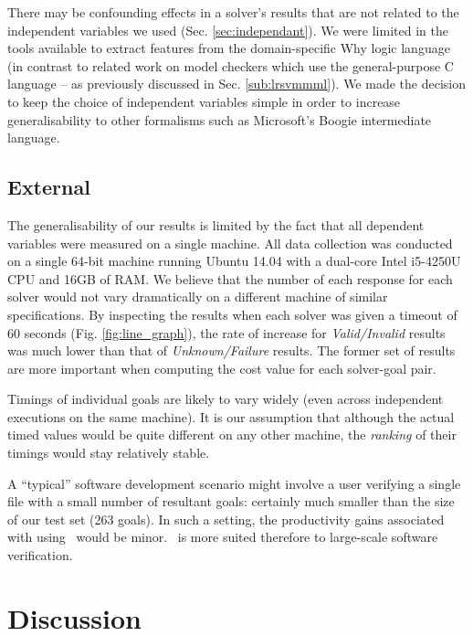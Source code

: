 There may be confounding effects in a solver's results that are not related to the independent variables we used (Sec. \ref{sec:independant}). 
We were limited in the tools available to extract features from the domain-specific Why logic language (in contrast to related work on model checkers which use the general-purpose C language \cite{DPVZ15:CAV, MUX} -- as previously discussed in Sec. \ref{sub:lrsvmmml}). 
We made the decision to keep the choice of independent variables simple in order to increase generalisability to other formalisms such as Microsoft's Boogie \cite{Boogie} intermediate language.  

\subsection{External}


The generalisability of our results is limited by the fact that all dependent variables were measured on a single machine.
All data collection was conducted on a single 64-bit machine running Ubuntu 14.04 with a dual-core Intel i5-4250U CPU and 16GB of RAM. 
We believe that the number of each response for each solver would not vary dramatically on a different machine of similar specifications. 
By inspecting the results when each solver was given a timeout of 60 seconds (Fig. \ref{fig:line_graph}), the rate of increase for \textit{Valid/Invalid} results was much lower than that of \textit{Unknown/Failure} results. 
The former set of results are more important when computing the cost value for each solver-goal pair.

Timings of individual goals are likely to vary widely (even across independent executions on the same machine).
It is our assumption that although the actual timed values would be quite different on any other machine, the \textit{ranking} of their timings would stay relatively stable.

A ``typical'' software development scenario might involve a user verifying a single file with a small number of resultant goals: certainly much smaller than the size of our test set (263 goals). In such a setting, the productivity gains associated with using \where~would be minor. 
\where~is more suited therefore to large-scale software verification.


\section{Discussion}
\label{sec:eval-discuss}

